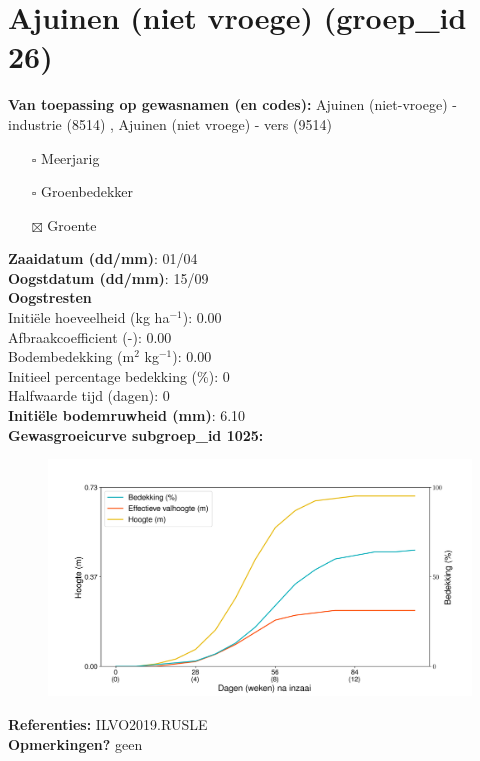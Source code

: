 \documentclass{article}
\begin{document}
 \section{Ajuinen (niet vroege) (groep\_id 26)} 
 \textbf{Van toepassing op gewasnamen (en codes):} Ajuinen (niet-vroege) - industrie (8514) , Ajuinen (niet vroege) - vers (9514) 
 \begin{multicols}{3} \begin{itemize} \item[$\square$] Meerjarig \item[$\square$] Groenbedekker \item[$\boxtimes$] Groente \end{itemize} \end{multicols} 
  \textbf{Zaaidatum (dd/mm)}: 01/04  \vspace{0.10cm} \\ 
  \textbf{Oogstdatum (dd/mm)}: 15/09  \vspace{0.10cm} \\ 
  \textbf{Oogstresten} \vspace{0.05cm} \\ 
  \tab Initi\"{e}le hoeveelheid (kg ha$^{-1}$): 0.00 \vspace{0.05cm} \\ 
  \tab Afbraakcoefficient (-): 0.00 \vspace{0.05cm} \\ 
  \tab Bodembedekking (m$^2$ kg$^{-1}$): 0.00 \vspace{0.05cm} \\ 
  \tab Initieel percentage bedekking (\%): 0 \vspace{0.05cm} \\ 
  \tab Halfwaarde tijd (dagen): 0 \vspace{0.05cm} \\ 
  \textbf{Initi\"{e}le bodemruwheid (mm)}: 6.10 \vspace{0.05cm} \\ 
  \textbf{Gewasgroeicurve subgroep\_id 1025:} 
 \begin{center} \begin{figure}[H] \includegraphics[width=12.5cm]{temp/1025.png} \end{figure} \end{center} 
  \textbf{Referenties:} ILVO2019.RUSLE \vspace{0.10cm} \\ 
  \textbf{Opmerkingen?} geen \vspace{0.10cm} \\ 
 \newpage 
\end{document}
